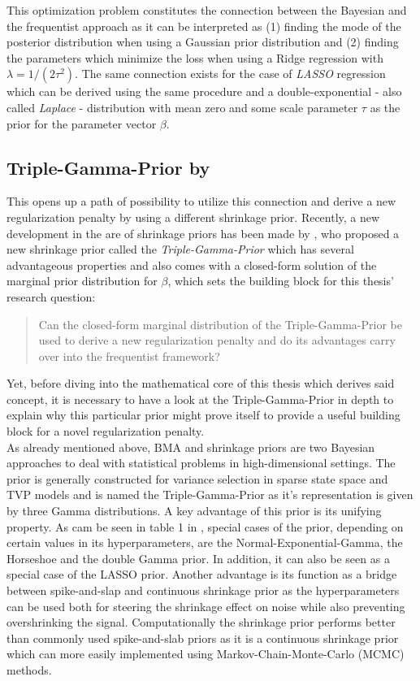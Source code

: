 \documentclass[12pt,a4paper]{article}
\begin{document}
This optimization problem constitutes the connection between the Bayesian and the frequentist approach as it can be interpreted as (1) finding the mode of the posterior distribution when using a Gaussian prior distribution and (2) finding the parameters which minimize the loss when using a Ridge regression with $\lambda = 1/(2\tau^2)$. The same connection exists for the case of \textit{LASSO} regression which can be derived using the same procedure and a double-exponential - also called \textit{Laplace} - distribution with mean zero and some scale parameter $\tau$ as the prior for the parameter vector $\beta$. 

\subsection{Triple-Gamma-Prior by \textcite{TGP2020}}
This opens up a path of possibility to utilize this connection and derive a new regularization penalty by using a different shrinkage prior. Recently, a new development in the are of shrinkage priors has been made by \textcite{TGP2020}, who proposed a new shrinkage prior called the \textit{Triple-Gamma-Prior} which has several advantageous properties and also comes with a closed-form solution of the marginal prior distribution for $\beta$, which sets the building block for this thesis' research question:

\begin{quote}
Can the closed-form marginal distribution of the Triple-Gamma-Prior
be used to derive a new regularization penalty and do its advantages
carry over into the frequentist framework?
\end{quote}

Yet, before diving into the mathematical core of this thesis which derives said concept, it is necessary to have a look at the Triple-Gamma-Prior in depth to explain why this particular prior might prove itself to provide a useful building block for a novel regularization penalty.\\

As already mentioned above, BMA and shrinkage priors are two Bayesian approaches to deal with statistical problems in high-dimensional settings. The prior is generally constructed for variance selection in sparse state space and TVP models and is named the Triple-Gamma-Prior as it's representation is given by three Gamma distributions. A key advantage of this prior is its unifying property. As cam be seen in table 1 in \textcite{TGP2020}, special cases of the prior, depending on certain values in its hyperparameters, are the Normal-Exponential-Gamma, the Horseshoe and the double Gamma prior. In addition, it can also be seen as a special case of the LASSO prior. Another advantage is its function as a bridge between spike-and-slap and continuous shrinkage prior as the hyperparameters can be used both for steering the shrinkage effect on noise while also preventing overshrinking the signal. Computationally the shrinkage prior performs better than commonly used spike-and-slab priors as it is a continuous shrinkage prior which can more easily implemented using Markov-Chain-Monte-Carlo (MCMC) methods.\\ 
\end{document}
